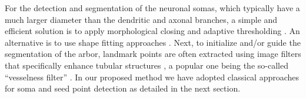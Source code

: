 
For the detection and segmentation of the neuronal somas, which typically have a much larger diameter than the dendritic and axonal branches, a simple and efficient solution is to apply morphological closing and adaptive thresholding \citep{yan2013automated}. An alternative is to use shape fitting approaches \citep{quan2013neurogps}. Next, to initialize and/or guide the segmentation of the arbor, landmark points are often extracted using image filters that specifically enhance tubular structures \citep{wang2011broadly, turetken2011automated, choromanska2012automatic, su2012junction, radojevic2016fuzzy}, a popular one being the so-called ``vesselness filter'' \citep{frangi1998multiscale}. In our proposed method we have adopted classical approaches for soma and seed point detection as detailed in the next section.

